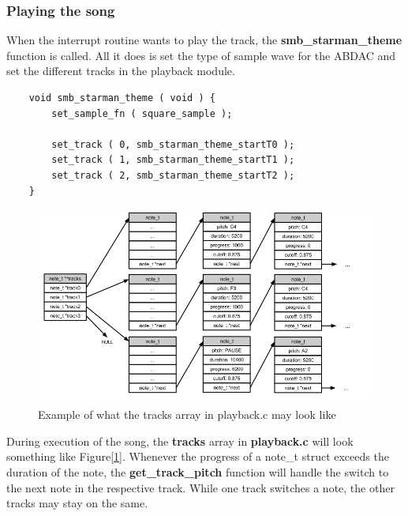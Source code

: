 \subsubsection{Playing the song}
When the interrupt routine wants to play the track, the \textbf{smb\_starman\_theme} function
is called. All it does is set the type of sample wave for the ABDAC and set the
different tracks in the playback module.
\begin{lstlisting}
	void smb_starman_theme ( void ) {
		set_sample_fn ( square_sample );

		set_track ( 0, smb_starman_theme_startT0 );
		set_track ( 1, smb_starman_theme_startT1 );
		set_track ( 2, smb_starman_theme_startT2 );
	}
\end{lstlisting}
\begin{figure}[h]
	\centerline{{\includegraphics[width=480px]{tracks_example.png}}}
	\caption{Example of what the tracks array in playback.c may look like}
	\label{tracks-example}
\end{figure}
During execution of the song, the \textbf{tracks} array in \textbf{playback.c}
will look something like Figure[\ref{tracks-example}].
Whenever the progress of a note\_t struct exceeds the duration of the note,
the \textbf{get\_track\_pitch} function will handle the switch
to the next note in the respective track. While one
track switches a note, the other tracks may stay on the same.
